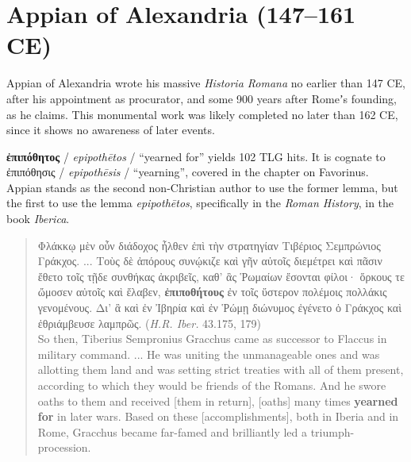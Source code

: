 %
%
\chapter{Appian of Alexandria (147--161 CE)}%
\vspace*{3mm}%
\justifying%
%
\noindent{}Appian of Alexandria wrote his massive \textit{Historia Romana} no earlier %
than 147 CE, after his appointment as procurator, %
and some 900 years after Romeʼs founding, as he claims. %
This monumental work was likely completed no later than 162 CE, %
since it shows no awareness of later events. %
\vfill{}

\noindent{}\textbf{ἐπιπόθητος} / \textit{epipothētos} / “yearned for” yields 102 TLG hits. %
It is cognate to ἐπιπόθησις / \textit{epipothēsis} / “yearning”, covered in the chapter on Favorinus. %
Appian stands as the second non-Christian author to use the former lemma, %
but the first to use the lemma \textit{epipothētos}, %
specifically in the \textit{Roman History}, in the book \textit{Iberica}. %

\vfill{}
 \begin{quote}Φλάκκῳ μὲν οὖν διάδοχος ἦλθεν ἐπὶ τὴν στρατηγίαν Τιβέριος Σεμπρώνιος Γράκχος. ... %
 Τοὺς δὲ ἀπόρους συνῴκιζε καὶ γῆν αὐτοῖς διεμέτρει %
 καὶ πᾶσιν ἔθετο τοῖς τῇδε συνθήκας ἀκριβεῖς, %
 καθ’ ἃς Ῥωμαίων ἔσονται φίλοι· %
 ὅρκους τε ὤμοσεν αὐτοῖς καὶ ἔλαβεν, \textbf{ἐπιποθήτους} ἐν τοῖς ὕστερον πολέμοις πολλάκις γενομένους. %
 Δι’ ἃ καὶ ἐν Ἰβηρία καὶ ἐν Ῥώμῃ διώνυμος ἐγένετο ὁ Γράκχος καὶ ἐθριάμβευσε λαμπρῶς. %
 (\textit{H.R. Iber.} 43.175, 179) \\[1mm] %
 So then, Tiberius Sempronius Gracchus came as successor to Flaccus in military command. ... %
 He was uniting the unmanageable ones and was allotting them land and was setting strict treaties with all of them present, %
 according to which they would be friends of the Romans. %
 And he swore oaths to them and received [them in return], %
 [oaths] many times \textbf{yearned for} in later wars. %
 Based on these [accomplishments], %
 both in Iberia and in Rome, Gracchus became far-famed and brilliantly led a triumph-procession.\end{quote} %
 \clearpage

